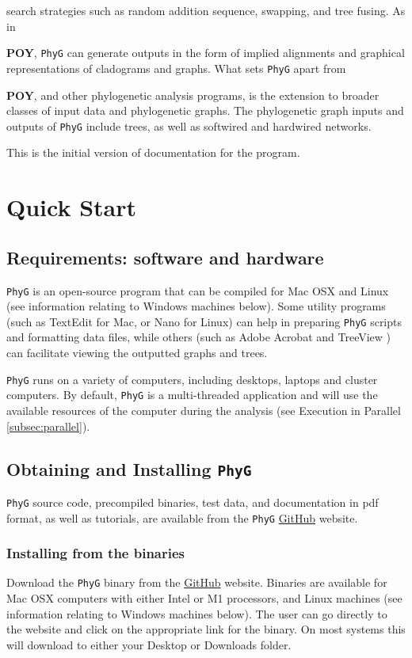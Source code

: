 \documentclass[11pt]{book}
\newcommand{\phyg}{\texttt{PhyG} }
\begin{document}
	search strategies such as random addition sequence, swapping, and tree fusing. As in {\textbf{POY}, 
	\phyg can generate outputs in the form of implied alignments and graphical representations of 
	cladograms and graphs. What sets \phyg apart from {\textbf{POY}, and other phylogenetic 
	analysis programs, is the extension to broader classes of input data and phylogenetic graphs. 
	The phylogenetic graph inputs and outputs of \texttt{PhyG} include trees, as well as softwired 
	and hardwired networks.
		
	This is the initial version of documentation for the program.

\section{Quick Start}
	
	\subsection{Requirements: software and hardware}
		\phyg is an open-source program that can be compiled for Mac OSX and Linux 
		(see information relating to Windows machines below). Some utility programs 
		(such as TextEdit for Mac, or Nano for Linux) can help in preparing \phyg scripts 
		and formatting data files, while others (such as Adobe Acrobat and TreeView 
		\citep{page1996}) can facilitate viewing the outputted graphs and trees.
		
		\phyg runs on a variety of computers, including desktops, laptops and cluster computers.
		By default, \phyg is a multi-threaded application and will use the available resources of 
		the computer during the analysis (see Execution in Parallel \ref{subsec:parallel}). 
		
	\subsection{Obtaining and Installing \phyg}
		\phyg source code, precompiled binaries, test data, and documentation in pdf format, 
		as well as tutorials, are available from the \phyg \href{https://github.com/amnh/PhyGraph}{GitHub} 
		website.

	\subsubsection{Installing from the binaries}
		Download the \phyg binary from the \href{https://github.com/amnh/PhyGraph}{GitHub} 
		website. Binaries are available for Mac OSX computers with either Intel or M1 processors, 
		and Linux machines (see information relating to Windows machines below).
		The user can go directly to the website and click on the appropriate link 
		for the binary. On most systems this will download to either your Desktop or Downloads folder. \\
		
}}
\end{document}
